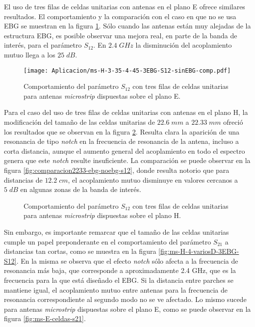 El uso de tres filas de celdas unitarias con antenas en el plano E ofrece similares resultados. El comportamiento y la comparación con el caso en que no se usa EBG se muestran en la figura \ref{fig:planoe-3ebg-comparacion}. Sólo cuando las antenas están muy alejadas de la estructura EBG, es posible observar una mejora real, en parte de la banda de interés, para el parámetro $S_{12}$. En $2.4\; GHz$ la disminución del acoplamiento mutuo llega a los $25\; dB$.

\begin{figure}[h]
	\centering
	\texttt{[image: Aplicacion/ms-H-3-35-4-45-3EBG-S12-sinEBG-comp.pdf]}
	\caption{Comportamiento del parámetro $S_{12}$ con tres filas de celdas unitarias para antenas \textit{microstrip} dispuestas sobre el plano E.}
	\label{fig:planoe-3ebg-comparacion}
\end{figure}


Para el caso del uso de tres filas de celdas unitarias con antenas en el plano H, la modificación del tamaño de las celdas unitarias de $22.6\;mm$ a $22.33 \;mm$ ofreció los resultados que se observan en la figura \ref{fig:2233-2ebg-h}. Resulta clara la aparición de una resonancia de tipo \textit{notch} en la frecuencia de resonancia de la antena, incluso a corta distancia, aunque el aumento general del acoplamiento en todo el espectro genera que este \textit{notch} resulte insuficiente. La comparación se puede observar en la figura \ref{fig:comparacion2233-ebg-noebg-s12}, donde resulta notorio que para distancias de $12.2 \;cm$, el acoplamiento mutuo disminuye en valores cercanos a $5\; dB$ en algunas zonas de la banda de interés.


\begin{figure}[H]
	\centering 
	\caption{Comportamiento del parámetro $S_{12}$ con tres filas de celdas unitarias para antenas \textit{microstrip} dispuestas sobre el plano H.}
	\label{fig:2233-2ebg-h}
\end{figure}

Sin embargo, es importante remarcar que el tamaño de las celdas unitarias cumple un papel preponderante en el comportamiento del parámetro $S_{21}$ a distancias tan cortas, como se muestra en la figura \ref{fig:ms-H-4-variosD-3EBG-S12}. En la misma se observa que el efecto \textit{notch} sólo afecta a la frecuencia de resonancia más baja, que corresponde a aproximadamente 2.4 GHz, que es la frecuencia para la que está diseñado el EBG. Si la distancia entre parches se mantiene igual, el acoplamiento mutuo entre antenas para la frecuencia de resonancia correspondiente al segundo modo no se ve afectado. Lo mismo sucede para antenas \textit{microstrip} dispuestas sobre el plano E, como se puede observar en la figura \ref{fig:ms-E-celdas-s21}.

